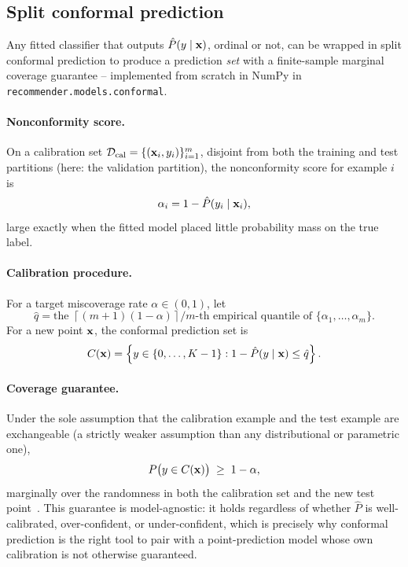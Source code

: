 \subsection{Split conformal prediction}

Any fitted classifier that outputs $\hat{P}(y \mid \mathbf{x})$, ordinal or not,
can be wrapped in split conformal prediction to produce a prediction
\emph{set} with a finite-sample marginal coverage guarantee -- implemented
from scratch in NumPy in \texttt{recommender.models.conformal}.

\paragraph{Nonconformity score.} On a calibration set
$\mathcal{D}_{\text{cal}} = \{(\mathbf{x}_i, y_i)\}_{i=1}^{m}$, disjoint from both the
training and test partitions (here: the validation partition), the
nonconformity score for example $i$ is
\begin{equation}
  \alpha_i = 1 - \hat{P}(y_i \mid \mathbf{x}_i),
  \label{eq:nonconformity}
\end{equation}
large exactly when the fitted model placed little probability mass on the
true label.

\paragraph{Calibration procedure.} For a target miscoverage rate
$\alpha \in (0, 1)$, let
\begin{equation}
  \hat{q} = \text{the } \left\lceil (m+1)(1-\alpha) \right\rceil / m
  \text{-th empirical quantile of } \{\alpha_1, \dots, \alpha_m\}.
  \label{eq:qhat}
\end{equation}
For a new point $\mathbf{x}$, the conformal prediction set is
\begin{equation}
  C(\mathbf{x}) = \left\{ y \in \{0, \dots, K-1\} :
  1 - \hat{P}(y \mid \mathbf{x}) \le \hat{q} \right\}.
  \label{eq:prediction-set}
\end{equation}

\paragraph{Coverage guarantee.} Under the sole assumption that the
calibration example and the test example are exchangeable (a strictly
weaker assumption than any distributional or parametric one),
\begin{equation}
  P\big(y \in C(\mathbf{x})\big) \; \ge \; 1 - \alpha,
  \label{eq:coverage-guarantee}
\end{equation}
marginally over the randomness in both the calibration set and the new test
point~\cite{vovk2005,lei2018,angelopoulos2023}. This guarantee is model-agnostic: it holds
regardless of whether $\hat{P}$ is well-calibrated, over-confident, or
under-confident, which is precisely why conformal prediction is the right
tool to pair with a point-prediction model whose own calibration is not
otherwise guaranteed.

